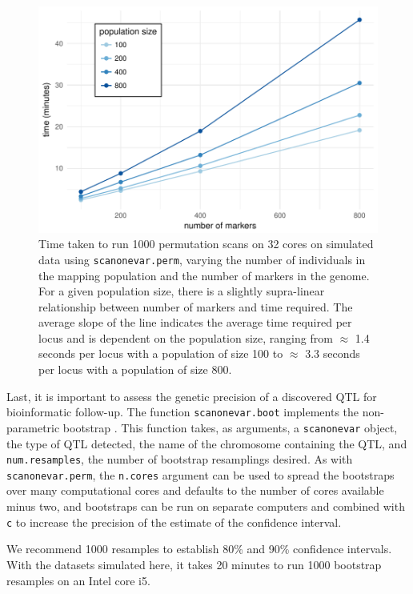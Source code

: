 \documentclass[9pt,twocolumn,twoside]{gsag3jnl}
\begin{document}
\begin{figure}[t]
    \includegraphics[width = \linewidth]{images/benchmark_sim_cross.pdf}
    \caption{
        Time taken to run 1000 permutation scans on 32 cores on simulated data using \texttt{scanonevar.perm}, varying the number of individuals in the mapping population and the number of markers in the genome.
        For a given population size, there is a slightly supra-linear relationship between number of markers and time required.
        The average slope of the line indicates the average time required per locus and is dependent on the population size, ranging from $\approx$ 1.4 seconds per locus with a population of size 100 to $\approx$ 3.3 seconds per locus with a population of size 800.
    }
    \label{fig:benchmark_sim_cross}
\end{figure}

Last, it is important to assess the genetic precision of a discovered QTL for bioinformatic follow-up.
The function \texttt{scanonevar.boot} implements the non-parametric bootstrap \citep{Visscher1996}.
This function takes, as arguments, a \texttt{scanonevar} object, the type of QTL detected, the name of the chromosome containing the QTL, and \texttt{num.resamples}, the number of bootstrap resamplings desired.
As with \texttt{scanonevar.perm}, the \texttt{n.cores} argument can be used to spread the bootstraps over many computational cores and defaults to the number of cores available minus two, and bootstraps can be run on separate computers and combined with \texttt{c} to increase the precision of the estimate of the confidence interval.

We recommend 1000 resamples to establish 80\% and 90\% confidence intervals.
With the datasets simulated here, it takes 20 minutes to run 1000 bootstrap resamples on an Intel core i5.
\end{document}
